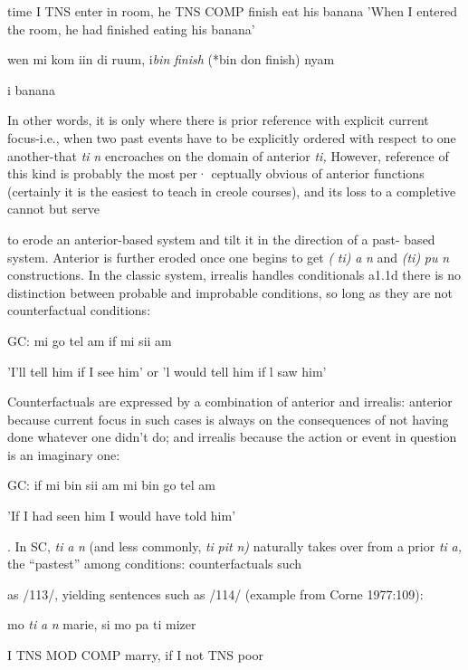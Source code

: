 time I TNS enter in room, he TNS COMP finish eat his banana 'When I entered the room, he had finished eating his banana'
\glt
\z

\ea\label{ex:111}
 wen mi kom iin di ruum, i\textit{bin} \textit{finish }(*bin don finish) nyam
\glt
\z

i banana

In other words, it is only where there is prior reference with explicit current focus-i.e., when two past events have to be explicitly ordered with respect to one another-that \textit{ti} \textit{n} encroaches on the domain of anterior \textit{ti,} However, reference of this kind is probably the most per· ceptually obvious of anterior functions (certainly it is the easiest to teach in creole courses), and its loss to a completive cannot but serve

to erode an anterior-based system and tilt it in the direction of a past-%
based system. %
Anterior is further eroded once one begins to get \textit{(} \textit{ti)} \textit{a} \textit{n} and \textit{(ti)} \textit{pu} \textit{n} constructions. In the classic system, irrealis handles condi\-tionals a1.1d there is no distinction between probable and improbable conditions, so long as they are not counterfactual conditions:

\ea\label{ex:112}
 GC: mi go tel am if mi sii am
\glt
\z

'I'll tell him if I see him' or 'l would tell him if l saw him'

Counterfactuals are expressed by a combination of anterior and irrealis: anterior because current focus in such cases is always on the conse\-quences of not having done whatever one didn't do; and irrealis because the action or event in question is an imaginary one:

\ea\label{ex:113}
 GC: if mi bin sii am mi bin go tel am
\glt
\z

'If I had seen him I would have told him'

. In SC, \textit{ti} \textit{a} \textit{n} (and less commonly, \textit{ti} \textit{pit} \textit{n}\textit{)} naturally takes over from a prior \textit{ti} \textit{a,} the ``pastest'' among conditions: counterfactuals such

as /113/, yielding sentences such as /114/ (example from Corne 1977:109):

\ea\label{ex:114}
 mo \textit{ti} \textit{a} \textit{n} marie, si mo pa ti mizer
\glt
\z

I TNS MOD COMP marry, if I not TNS poor

